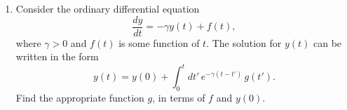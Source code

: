 \documentclass[10pt,a4paper]{article}
\begin{document}
\begin{enumerate}
\item
  Consider the ordinary differential equation
  \begin{equation}
    \frac{dy}{dt} = - \gamma y(t) + f(t),
  \end{equation}
  where $\gamma > 0$ and $f(t)$ is some function of $t$. The solution
  for $y(t)$ can be written in the form
  \begin{equation}
    y(t) = y(0) + \int_0^t dt' \, e^{-\gamma(t-t')} \, g(t').
  \end{equation}
  Find the appropriate function $g$, in terms of $f$ and $y(0)$.
\end{enumerate}
    
\end{document}
